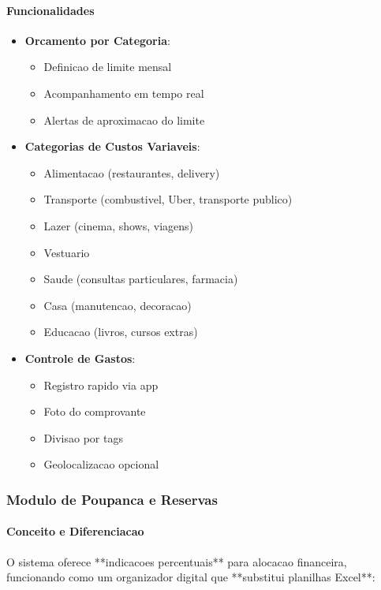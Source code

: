 \paragraph{Funcionalidades}
\begin{itemize}
    \item \textbf{Orcamento por Categoria}:
    \begin{itemize}
        \item Definicao de limite mensal
        \item Acompanhamento em tempo real
        \item Alertas de aproximacao do limite
    \end{itemize}
    
    \item \textbf{Categorias de Custos Variaveis}:
    \begin{itemize}
        \item Alimentacao (restaurantes, delivery)
        \item Transporte (combustivel, Uber, transporte publico)
        \item Lazer (cinema, shows, viagens)
        \item Vestuario
        \item Saude (consultas particulares, farmacia)
        \item Casa (manutencao, decoracao)
        \item Educacao (livros, cursos extras)
    \end{itemize}
    
    \item \textbf{Controle de Gastos}:
    \begin{itemize}
        \item Registro rapido via app
        \item Foto do comprovante
        \item Divisao por tags
        \item Geolocalizacao opcional
    \end{itemize}
\end{itemize}

\subsubsection{Modulo de Poupanca e Reservas}

\paragraph{Conceito e Diferenciacao}
O sistema oferece **indicacoes percentuais** para alocacao financeira, funcionando como um organizador digital que **substitui planilhas Excel**:


